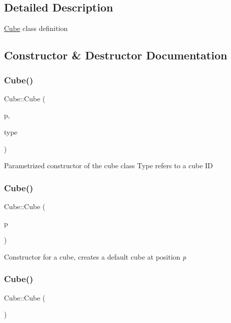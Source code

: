 \subsection{Detailed Description}
\mbox{\hyperlink{classCube}{Cube}} class definition 

\subsection{Constructor \& Destructor Documentation}
\mbox{\label{classCube_a1609058c502ef5aa5d162809d156826b}} 
\subsubsection{\texorpdfstring{Cube()}{Cube()}\hspace{0.1cm}{\footnotesize\ttfamily [1/3]}}
{\footnotesize\ttfamily Cube\+::\+Cube (\begin{DoxyParamCaption}\item[{vec3}]{p,  }\item[{\mbox{\hyperlink{Cube_8hpp_ae2a13060ddab6f6437cc4d66a1f7c370}{Cube\+ID}}}]{type }\end{DoxyParamCaption})}

Parametrized constructor of the cube class Type refers to a cube ID \mbox{\label{classCube_a8ac9a092c5f71dd72671e83d406474aa}} 
\subsubsection{\texorpdfstring{Cube()}{Cube()}\hspace{0.1cm}{\footnotesize\ttfamily [2/3]}}
{\footnotesize\ttfamily Cube\+::\+Cube (\begin{DoxyParamCaption}\item[{vec3}]{p }\end{DoxyParamCaption})}

Constructor for a cube, creates a default cube at position {\itshape p} {\itshape } \mbox{\label{classCube_a06f3d86fb63e3aad08623610aa3c17b4}} 
\subsubsection{\texorpdfstring{Cube()}{Cube()}\hspace{0.1cm}{\footnotesize\ttfamily [3/3]}}
{\footnotesize\ttfamily Cube\+::\+Cube (\begin{DoxyParamCaption}{ }\end{DoxyParamCaption})}

